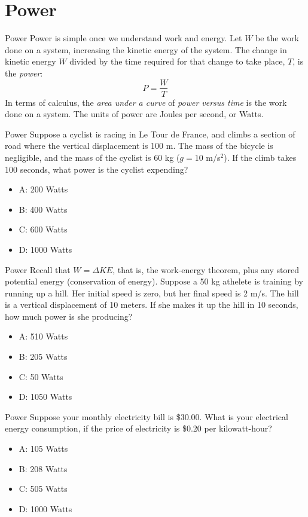 \documentclass{beamer}
\begin{document}
\section{Power}

\begin{frame}{Power}
Power is simple once we understand work and energy.  Let $W$ be the work done on a system, increasing the kinetic energy of the system.  The change in kinetic energy $W$ divided by the time required for that change to take place, $T$, is the \alert{\textit{power}}:
\begin{equation}
\boxed{
P = \frac{W}{T}
}
\end{equation}
In terms of calculus, the \textit{area under a curve} of \textit{power versus time} is the work done on a system.  The units of power are Joules per second, or Watts.
\end{frame}

\begin{frame}{Power}
Suppose a cyclist is racing in Le Tour de France, and climbs a section of road where the vertical displacement is 100 m.  The mass of the bicycle is negligible, and the mass of the cyclist is 60 kg ($g = 10$ m/s$^2$).  If the climb takes 100 seconds, what power is the cyclist expending?
\begin{itemize}
\item A: 200 Watts
\item B: 400 Watts
\item C: 600 Watts
\item D: 1000 Watts
\end{itemize}
\end{frame}

\begin{frame}{Power}
Recall that $W = \Delta KE$, that is, the work-energy theorem, plus any stored potential energy (conservation of energy).  Suppose a 50 kg athelete is training by running up a hill.  Her initial speed is zero, but her final speed is 2 m/s.  The hill is a vertical displacement of 10 meters.  If she makes it up the hill in 10 seconds, how much power is she producing?
\begin{itemize}
\item A: 510 Watts
\item B: 205 Watts
\item C: 50 Watts
\item D: 1050 Watts
\end{itemize}
\end{frame}

\begin{frame}{Power}
Suppose your monthly electricity bill is \$30.00.  What is your electrical energy consumption, if the price of electricity is \$0.20 per kilowatt-hour?
\begin{itemize}
\item A: 105 Watts
\item B: 208 Watts
\item C: 505 Watts
\item D: 1000 Watts
\end{itemize}
\end{frame}
\end{document}
